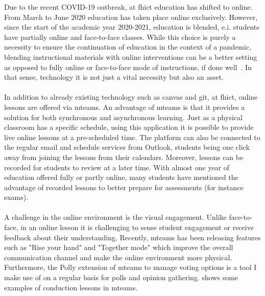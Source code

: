 Due to the recent COVID-19 outbreak, at \acrshort{fhict} education has shifted to online. 
From March to June 2020 education has taken place online exclusively. However, since the start of the academic year 2020-2021, education is blended, e.i. students have partially online and face-to-face classes.
While this choice is purely a necessity to ensure the continuation of education in the context of a pandemic, blending instructional materials with online interventions can be a better setting as opposed to fully online or face-to-face mode of instructions, if done well~\cite{blended2020}. 
In that sense, technology it is not just a vital necessity but also an asset. 
\\\\
In addition to already existing technology such as \Gls{canvas} and \Gls{git}, at \acrshort{fhict}, online lessons are offered via \Gls{mteams}. 
An advantage of \Gls{mteams} is that it provides a solution for both synchronous and asynchronous learning. 
Just as a physical classroom has a specific schedule, using this application it is possible to provide live online lessons at a pre-scheduled time. The platform can also be connected to the regular email and schedule services from Outlook, students being one click away from joining the lessons from their calendars. Moreover, lessons can be recorded for students to review at a later time. With almost one year of education offered fully or partly online, many students have mentioned the advantage of recorded lessons to better prepare for assessments (for instance exams).\\\\
A challenge in the online environment is the visual engagement. Unlike face-to-face, in an online lesson it is challenging to sense student engagement or receive feedback about their understanding. Recently, \Gls{mteams} has been releasing features such as "Rise your hand" and "Together mode" which improve the overall communication channel and make the online environment more physical. Furthermore, the Polly extension of \Gls{mteams} to manage voting options is a tool I make use of on a regular basis for polls and opinion gathering.  shows some examples of conduction lessons in \Gls{mteams}. 




